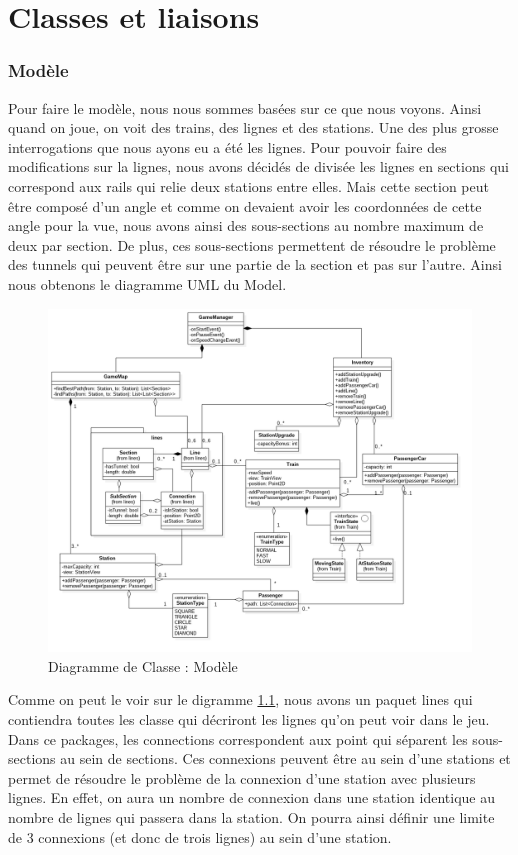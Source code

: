 \documentclass[report, backcover, french, nodocumentinfo]{upmethodology-document}
\begin{document}
	\chapter{Classes et liaisons}
		\subsection{Modèle}
			\p{}
			Pour faire le modèle, nous nous sommes basées sur ce que nous voyons. Ainsi quand on joue, on voit des trains, des lignes et des stations. Une des plus grosse interrogations que nous ayons eu a été les lignes. Pour pouvoir faire des modifications sur la lignes, nous avons décidés de divisée les lignes en sections qui correspond aux rails qui relie deux stations entre elles. Mais cette section peut être composé d'un angle et comme on devaient avoir les coordonnées de cette angle pour la vue, nous avons ainsi des sous-sections au nombre maximum de deux par section. De plus, ces sous-sections permettent de résoudre le problème des tunnels qui peuvent être sur une partie de la section et pas sur l'autre. Ainsi nous obtenons le diagramme UML du Model.
			\begin{figure}[h!]
				\centering
				\includegraphics[width=1\textwidth]{figures/ModelClassDiagram} %
				\caption{Diagramme de Classe : Modèle}
				\label{fig:ModelClassDiagram}
			\end{figure}
			\p{}
			Comme on peut le voir sur le digramme \ref{fig:ModelClassDiagram}, nous avons un paquet lines qui contiendra toutes les classe qui décriront les lignes qu'on peut voir dans le jeu. Dans ce packages, les connections correspondent aux point qui séparent les sous-sections au sein de sections. Ces connexions peuvent être au sein d'une stations et permet de résoudre le problème de la connexion d'une station avec plusieurs lignes. En effet, on aura un nombre de connexion dans une station identique au nombre de lignes qui passera dans la station. On pourra ainsi définir une limite de 3 connexions (et donc de trois lignes) au sein d'une station. 
\end{document}
